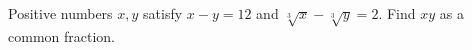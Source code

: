 Positive numbers $x,y$ satisfy $x-y=12$ and $\sqrt[3]x-\sqrt[3]y=2$. Find $xy$ as a common fraction.
